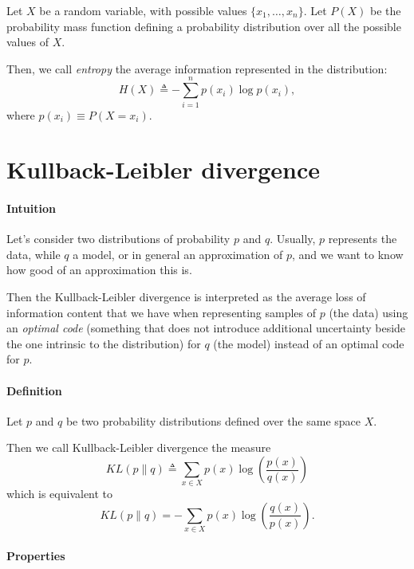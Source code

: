 Let $X$ be a random variable, with possible values $\{ x_1, \dots, x_n \}$. Let $P(X)$ be the probability mass function defining a probability distribution over all the possible values of $X$.

Then, we call \emph{entropy} the average information represented in the distribution:
\begin{equation}
	H(X) \triangleq - \sum_{i=1}^{n} p(x_i) \log p(x_i),
\end{equation}
where $p(x_i) \equiv P(X = x_i)$.

\section{Kullback-Leibler divergence}

\paragraph{Intuition}

Let's consider two distributions of probability $p$ and $q$. Usually, $p$ represents the data, while $q$ a model, or in general an approximation of $p$, and we want to know how good of an approximation this is.

Then the Kullback-Leibler divergence is interpreted as the average loss of information content that we have when representing samples of $p$ (the data) using an \emph{optimal code} (something that does not introduce additional uncertainty beside the one intrinsic to the distribution) for $q$ (the model) instead of an optimal code for $p$.

\paragraph{Definition}
Let $p$ and $q$ be two probability distributions defined over the same space $X$. 

Then we call Kullback-Leibler divergence the measure
\begin{equation}
    KL (p \| q) \triangleq \sum_{x \in X} p(x) \log \left( \frac{p(x)}{q(x)} \right)
\end{equation}
which is equivalent to
\begin{equation}
    KL (p \| q) = -\sum_{x \in X} p(x) \log \left( \frac{q(x)}{p(x)} \right).
\end{equation}

\paragraph{Properties}

